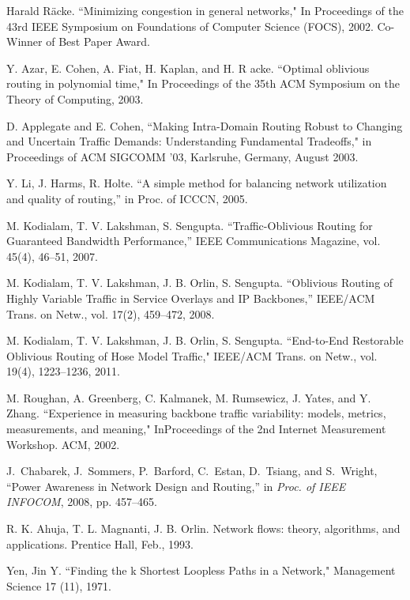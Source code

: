 \documentclass[conference]{IEEEtran}
\begin{document}
\begin{thebibliography}{1}
Harald R\"{a}cke. ``Minimizing congestion in general networks," In Proceedings of the 43rd IEEE Symposium on Foundations of Computer Science (FOCS), 2002. Co-Winner of Best Paper Award.

Y. Azar, E. Cohen, A. Fiat, H. Kaplan, and H. R acke. ``Optimal oblivious routing in polynomial time," In Proceedings of the 35th ACM Symposium on the Theory of Computing, 2003.

D. Applegate and E. Cohen, ``Making Intra-Domain Routing Robust to Changing and Uncertain Traffic Demands: Understanding Fundamental Tradeoffs," in Proceedings of ACM SIGCOMM ’03, Karlsruhe, Germany, August 2003.

Y. Li, J. Harms, R. Holte. ``A simple method for balancing network utilization and quality of routing,'' in Proc. of ICCCN, 2005.

M. Kodialam, T. V. Lakshman, S. Sengupta. ``Traffic-Oblivious Routing for Guaranteed Bandwidth Performance,'' IEEE Communications Magazine, vol. 45(4), 46--51, 2007.

M. Kodialam, T. V. Lakshman, J. B. Orlin, S. Sengupta. ``Oblivious Routing of Highly Variable Traffic in Service Overlays and IP Backbones,'' IEEE/ACM Trans. on Netw., vol. 17(2), 459--472, 2008.

M. Kodialam, T. V. Lakshman, J. B. Orlin, S. Sengupta. ``End-to-End Restorable Oblivious Routing of Hose Model Traffic," IEEE/ACM Trans. on Netw., vol. 19(4), 1223--1236, 2011.

M. Roughan, A. Greenberg, C. Kalmanek, M. Rumsewicz, J. Yates, and Y. Zhang. ``Experience in measuring backbone traffic variability: models, metrics, measurements, and meaning," InProceedings of the 2nd Internet Measurement Workshop. ACM, 2002.

 J.~Chabarek, J.~Sommers,
    P.~Barford, C.~Estan, D.~Tsiang, and S.~Wright,
  ``{P}ower {A}wareness in {N}etwork {D}esign and {R}outing,'' in \emph{Proc.
  of IEEE INFOCOM}, 2008, pp. 457--465.

R. K. Ahuja, T. L. Magnanti, J. B. Orlin. Network flows: theory, algorithms, and applications. Prentice Hall, Feb., 1993.

Yen, Jin Y. ``Finding the k Shortest Loopless Paths in a Network," Management Science 17 (11), 1971.


\end{thebibliography}
\end{document}
